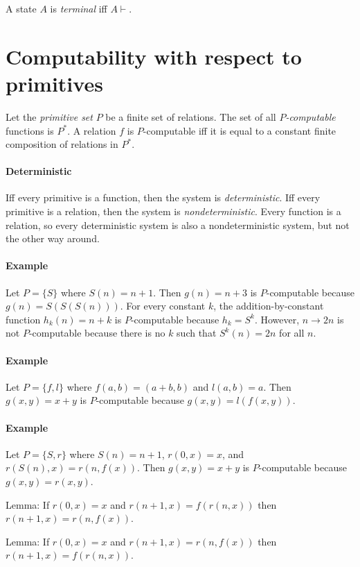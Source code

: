 A state \(A\) is \emph{terminal} iff \(A \vdash\).

\section{Computability with respect to primitives}

Let the \emph{primitive set} \(P\) be a finite set of relations.
The set of all \emph{\(P\)-computable} functions is \(P^*\).
A relation \(f\) is \(P\)-computable iff it is equal to
a constant finite composition of relations in \(P^*\).

\paragraph{Deterministic}
Iff every primitive is a function,
then the system is \emph{deterministic}.
Iff every primitive is a relation,
then the system is \emph{nondeterministic}.
Every function is a relation,
so every deterministic system is also a nondeterministic system,
but not the other way around.

\paragraph{Example}
Let \(P = \{S\}\) where \(S(n) = n+1\).
Then \(g(n) = n + 3\) is \(P\)-computable because \(g(n) = S(S(S(n)))\).
For every constant \(k\), the addition-by-constant function \(h_k(n) = n+k\) is \(P\)-computable because \(h_k = S^k\).
However, \(n \to 2n\) is not \(P\)-computable
because there is no \(k\) such that \(S^k(n) = 2n\) for all \(n\).

\paragraph{Example}
Let \(P = \{f,l\}\) where \(f(a,b) = (a+b,b)\) and \(l(a,b) = a\).
Then \(g(x,y) = x+y\) is \(P\)-computable because \(g(x,y) = l(f(x,y))\).

\paragraph{Example}
Let \(P = \{S,r\}\) where \(S(n)=n+1\), \(r(0,x) = x\), and \(r(S(n),x) = r(n,f(x))\).
Then \(g(x,y) = x+y\) is \(P\)-computable because \(g(x,y) = r(x,y)\).

Lemma:
If \(r(0,x) = x\) and \(r(n+1,x) = f(r(n,x))\) then \(r(n+1,x) = r(n,f(x))\).

Lemma:
If \(r(0,x) = x\) and \(r(n+1,x) = r(n,f(x))\) then \(r(n+1,x) = f(r(n,x))\).

